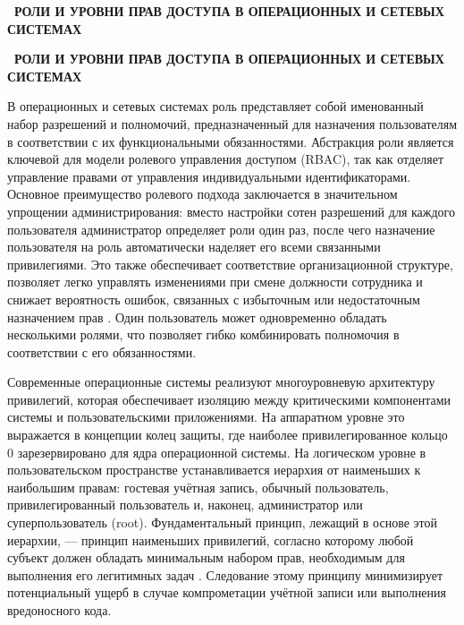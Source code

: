 \documentclass{SibFU-docs}
\begin{document}
\newpage
{}
\begin{center}\textbf{\thesection\ РОЛИ И УРОВНИ ПРАВ ДОСТУПА В ОПЕРАЦИОННЫХ И СЕТЕВЫХ СИСТЕМАХ}\end{center}
\vspace*{-1.5em}
\begin{center}\textbf{\thesection\ РОЛИ И УРОВНИ ПРАВ ДОСТУПА В ОПЕРАЦИОННЫХ И СЕТЕВЫХ СИСТЕМАХ}\end{center}
\vspace*{-1.5em}


В операционных и сетевых системах роль представляет собой именованный набор разрешений и полномочий, предназначенный для назначения пользователям в соответствии с их функциональными обязанностями. Абстракция роли является ключевой для модели ролевого управления доступом (RBAC), так как отделяет управление правами от управления индивидуальными идентификаторами. Основное преимущество ролевого подхода заключается в значительном упрощении администрирования: вместо настройки сотен разрешений для каждого пользователя администратор определяет роли один раз, после чего назначение пользователя на роль автоматически наделяет его всеми связанными привилегиями. Это также обеспечивает соответствие организационной структуре, позволяет легко управлять изменениями при смене должности сотрудника и снижает вероятность ошибок, связанных с избыточным или недостаточным назначением прав \cite{microsoft2025rbac}. Один пользователь может одновременно обладать несколькими ролями, что позволяет гибко комбинировать полномочия в соответствии с его обязанностями.


Современные операционные системы реализуют многоуровневую архитектуру привилегий, которая обеспечивает изоляцию между критическими компонентами системы и пользовательскими приложениями. На аппаратном уровне это выражается в концепции колец защиты, где наиболее привилегированное кольцо 0 зарезервировано для ядра операционной системы. На логическом уровне в пользовательском пространстве устанавливается иерархия от наименьших к наибольшим правам: гостевая учётная запись, обычный пользователь, привилегированный пользователь и, наконец, администратор или суперпользователь (root). Фундаментальный принцип, лежащий в основе этой иерархии, — принцип наименьших привилегий, согласно которому любой субъект должен обладать минимальным набором прав, необходимым для выполнения его легитимных задач \cite{cycode2024polp}. Следование этому принципу минимизирует потенциальный ущерб в случае компрометации учётной записи или выполнения вредоносного кода.
\end{document}
